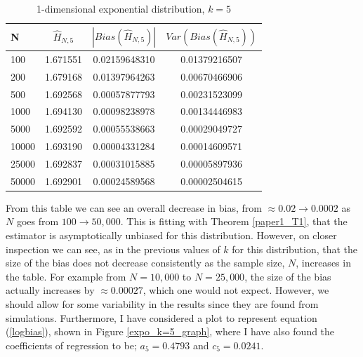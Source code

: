 \documentclass{article}
\begin{document}
\begin{table}
\caption{1-dimensional exponential distribution, $k=5$} \label{expo_k=5_table}
\begin{center}
\begin{tabular}{| l | c c c|} 
\toprule
N & $\hat{H}_{N, 5}$ & $|Bias(\hat{H}_{N, 5})|$ & $Var(Bias(\hat{H}_{N, 5}))$ \\
\midrule[1pt]
100     & 1.671551     & 0.02159648310     & 0.01379216507  \\
200     & 1.679168     & 0.01397964263     & 0.00670466906  \\
500     & 1.692568     & 0.00057877793     & 0.00231523099  \\
1000    & 1.694130     & 0.00098238978     & 0.00134446983  \\
5000    & 1.692592     & 0.00055538663     & 0.00029049727  \\
10000   & 1.693190     & 0.00004331284     & 0.00014609571  \\
25000   & 1.692837     & 0.00031015885     & 0.00005897936  \\
50000   & 1.692901     & 0.00024589568     & 0.00002504615  \\
\hline
\end{tabular}
\end{center}
\end{table}

From this table we can see an overall decrease in bias, from $\approx 0.02 \to 0.0002$ as $N$ goes from $100 \to 50,000$. This is fitting with Theorem \ref{paper1_T1}, that the estimator is asymptotically unbiased for this distribution. However, on closer inspection we can see, as in the previous values of $k$ for this distribution, that the size of the bias does not decrease consistently as the sample size, $N$, increases in the table. For example from $N=10,000$ to $N=25,000$, the size of the bias actually increases by $\approx 0.00027$, which one would not expect. However, we should allow for some variability in the results since they are found from simulations. 
Furthermore, I have considered a plot to represent equation (\ref{logbias}), shown in Figure \ref{expo_k=5_graph}, where I have also found the coefficients of regression to be; $a_{5} = 0.4793$ and $c_{5} = 0.0241$. 
\end{document}
